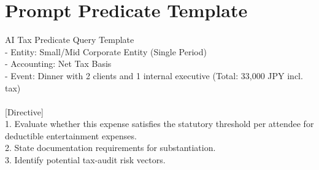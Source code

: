\section{Prompt Predicate Template}
\begin{calcbox}{AI Tax Predicate Query Template}
\small\ttfamily
[Premise]\\
- Entity: Small/Mid Corporate Entity (Single Period)\\
- Accounting: Net Tax Basis\\
- Event: Dinner with 2 clients and 1 internal executive (Total: 33,000 JPY incl. tax)\\
{}\\
{[Directive]}\\
1. Evaluate whether this expense satisfies the statutory threshold per attendee for deductible entertainment expenses.\\
2. State documentation requirements for substantiation.\\
3. Identify potential tax-audit risk vectors.
\end{calcbox}
\fi
